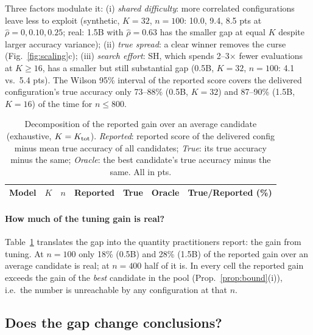 Three factors modulate it: (i) \emph{shared difficulty}: more correlated configurations leave less to exploit (synthetic, $K{=}32$, $n{=}100$: 10.0, 9.4, 8.5 pts at $\hat\rho=0,0.10,0.25$; real: 1.5B with $\hat\rho=0.63$ has the smaller gap at equal $K$ despite larger accuracy variance); (ii) \emph{true spread}: a clear winner removes the curse (Fig.~\ref{fig:scaling}c); (iii) \emph{search effort}: SH, which spends 2--3$\times$ fewer evaluations at $K\ge16$, has a smaller but still substantial gap (0.5B, $K{=}32$, $n{=}100$: 4.1 vs.\ 5.4 pts).
The Wilson 95\% interval of the reported score covers the delivered configuration's true accuracy only 73--88\% (0.5B, $K{=}32$) and 87--90\% (1.5B, $K{=}16$) of the time for $n\le800$.

\begin{table}[t]
\caption{Decomposition of the reported gain over an average candidate (exhaustive, $K=K_{\rm tot}$). \emph{Reported}: reported score of the delivered config minus mean true accuracy of all candidates; \emph{True}: its true accuracy minus the same; \emph{Oracle}: the best candidate's true accuracy minus the same. All in pts.}\label{tab:gain}
\centering\footnotesize
\begin{tabular}{lrrrrrr}
\toprule Model & $K$ & $n$ & Reported & True & Oracle & True/Reported (\%)\\ \midrule
\end{tabular}
\end{table}
\paragraph{How much of the tuning gain is real?}
Table~\ref{tab:gain} translates the gap into the quantity practitioners report: the gain from tuning.
At $n=100$ only 18\% (0.5B) and 28\% (1.5B) of the reported gain over an average candidate is real; at $n=400$ half of it is.
In every cell the reported gain exceeds the gain of the \emph{best} candidate in the pool (Prop.~\ref{prop:bound}(i)), i.e.\ the number is unreachable by any configuration at that $n$.

\subsection{Does the gap change conclusions?}\label{sec:decisions}
